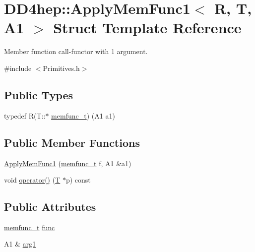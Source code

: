 \hypertarget{struct_d_d4hep_1_1_apply_mem_func1}{}\section{D\+D4hep\+:\+:Apply\+Mem\+Func1$<$ R, T, A1 $>$ Struct Template Reference}
\label{struct_d_d4hep_1_1_apply_mem_func1}


Member function call-\/functor with 1 argument.  




{\ttfamily \#include $<$Primitives.\+h$>$}

\subsection*{Public Types}
\begin{DoxyCompactItemize}
\item 
typedef R(T\+::$\ast$ \hyperlink{struct_d_d4hep_1_1_apply_mem_func1_a8d2f05f9fd623eebfcfa252c8102783c}{memfunc\+\_\+t}) (A1 a1)
\end{DoxyCompactItemize}
\subsection*{Public Member Functions}
\begin{DoxyCompactItemize}
\item 
\hyperlink{struct_d_d4hep_1_1_apply_mem_func1_aa912c5b5b164fd74df16143aa1b85140}{Apply\+Mem\+Func1} (\hyperlink{struct_d_d4hep_1_1_apply_mem_func1_a8d2f05f9fd623eebfcfa252c8102783c}{memfunc\+\_\+t} f, A1 \&a1)
\item 
void \hyperlink{struct_d_d4hep_1_1_apply_mem_func1_a3d37fd62fb489f329dffe33489bf4ef0}{operator()} (\hyperlink{class_t}{T} $\ast$p) const
\end{DoxyCompactItemize}
\subsection*{Public Attributes}
\begin{DoxyCompactItemize}
\item 
\hyperlink{struct_d_d4hep_1_1_apply_mem_func1_a8d2f05f9fd623eebfcfa252c8102783c}{memfunc\+\_\+t} \hyperlink{struct_d_d4hep_1_1_apply_mem_func1_ac13bb60da947716106d65b273854ef73}{func}
\item 
A1 \& \hyperlink{struct_d_d4hep_1_1_apply_mem_func1_aa1ef32d2750d2c3a55881e9198ba78d2}{arg1}
\end{DoxyCompactItemize}


